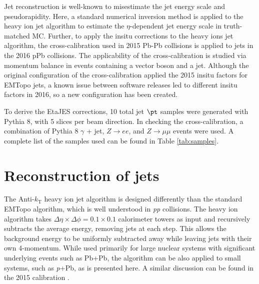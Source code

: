 \documentclass[NOTE, atlasdraft=true, texlive=2016, USenglish]{\ATLASLATEXPATH atlasdoc}
\begin{document}
Jet reconstruction is well-known to misestimate the jet energy scale and pseudorapidity. Here, a standard numerical inversion method is applied to the heavy ion jet algorithm to estimate the $\eta$-dependent jet energy scale in truth-matched MC. Further, to apply the insitu corrections to the heavy ions jet algorithm, the cross-calibration used in 2015 Pb-Pb collisions is applied to jets in the 2016 pPb collisions. The applicability of the cross-calibration is studied via momentum balance in events containing a vector boson and a jet. Although the original configuration of the cross-calibration applied the 2015 insitu factors for EMTopo jets, a known issue between software releases led to different insitu factors in 2016, so a new configuration has been created.\par
To derive the EtaJES corrections, 10 total jet $\pt$ samples were generated with Pythia 8, with 5 slices per beam direction. In checking the cross-calibration, a combination of Pythia 8 $\gamma$ + jet, $Z\rightarrow ee$, and $Z\rightarrow \mu\mu$ events were used. A complete list of the samples used can be found in Table \ref{tab:samples}.


\section{Reconstruction of jets}
\label{sec:reconstruction}

The Anti-$k_{\text{T}}$ heavy ion jet algorithm is designed differently than the standard EMTopo algorithm, which is well understood in \textit{pp} collisions. The heavy ion algorithm takes $\Delta\eta\times\Delta\phi=0.1\times0.1$ calorimeter towers as input and recursively subtracts the average energy, removing jets at each step. This allows the background energy to be uniformly subtracted away while leaving jets with their own 4-momentum. While used primarily for large nuclear systems with significant underlying events such as Pb+Pb, the algorithm can be also applied to small systems, such as \textit{p}+Pb, as is presented here. A similar discussion can be found in the 2015 calibration .\par
\end{document}
